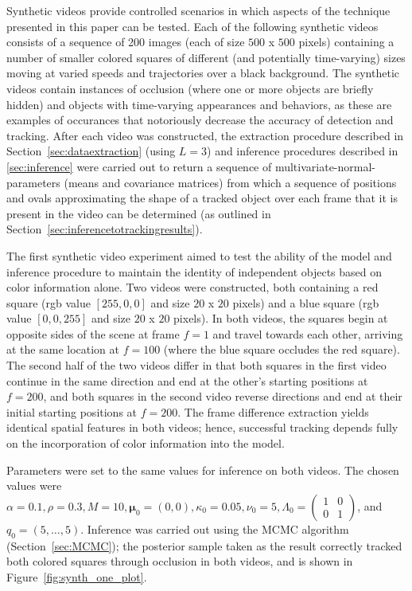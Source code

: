 \documentclass[twocolumn, final]{svjour3}
\begin{document}
Synthetic videos provide controlled scenarios in which aspects of the technique presented in this paper can be tested. Each of the following synthetic videos consists of a sequence of 200 images (each of size $500$ x $500$ pixels) containing a number of smaller colored squares of different (and potentially time-varying) sizes moving at varied speeds and trajectories over a black background. The synthetic videos contain instances of occlusion (where one or more objects are briefly hidden) and objects with time-varying appearances and behaviors, as these are examples of occurances that notoriously decrease the accuracy of detection and tracking. After each video was constructed, the extraction procedure described in Section~\ref{sec:dataextraction} (using $L=3$) and inference procedures described in \ref{sec:inference} were carried out to return a sequence of multivariate-normal-parameters (means and covariance matrices) from which a sequence of positions and ovals approximating the shape of a tracked object over each frame that it is present in the video can be determined (as outlined in Section~\ref{sec:inferencetotrackingresults}).

The first synthetic video experiment aimed to test the ability of the model and inference procedure to maintain the identity of independent objects based on color information alone. Two videos were constructed, both containing a red square (rgb value $[255,0,0]$ and size $20$ x $20$ pixels) and a blue square (rgb value $[0,0,255]$ and size $20$ x $20$ pixels). In both videos, the squares begin at opposite sides of the scene at frame $f=1$ and travel towards each other, arriving at the same location at $f=100$ (where the blue square occludes the red square). The second half of the two videos differ in that both squares in the first video continue in the same direction and end at the other's starting positions at $f=200$, and both squares in the second video reverse directions and end at their initial starting positions at $f=200$. The frame difference extraction yields identical spatial features in both videos; hence, successful tracking depends fully on the incorporation of color information into the model.

Parameters were set to the same values for inference on both videos. The chosen values were $\alpha = 0.1, \rho = 0.3, M = 10, \boldsymbol{\mu}_{0} = (0,0), \kappa_{0} = 0.05, \nu_{0} = 5, \Lambda_{0} = \left( \begin{smallmatrix} 1&0\\ 0&1 \end{smallmatrix} \right)$, and $q_{0} = (5, \ldots, 5)$. Inference was carried out using the MCMC algorithm (Section~\ref{sec:MCMC}); the posterior sample taken as the result correctly tracked both colored squares through occlusion in both videos, and is shown in Figure~\ref{fig:synth_one_plot}. 
\end{document}
